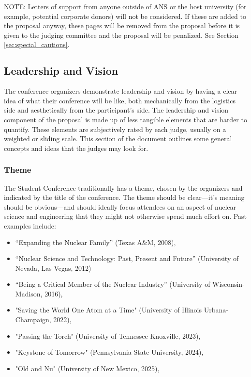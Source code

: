 \documentclass[12pt]{article}
\begin{document}
NOTE: Letters of support from anyone outside of ANS or the host university (for example,
potential corporate donors) will not be considered. If these are added to the
proposal anyway, these pages will be removed from the proposal before it is given to
the judging committee and the proposal will be penalized. See Section \ref{sec:special_cautions}.

\subsection{Leadership and Vision} \label{sec:LandV2}
The conference organizers demonstrate leadership and vision by having a clear idea of
what their conference will be like, both mechanically from the logistics side and
aesthetically from the participant’s side. The leadership and vision component of the
proposal is made up of less tangible elements that are harder to quantify. These elements
are subjectively rated by each judge, usually on a weighted or sliding scale. This section
of the document outlines some general concepts and ideas that the judges may look for.


\subsubsection{Theme}
The Student Conference traditionally has a theme, chosen by the organizers and indicated
by the title of the conference. The theme should be clear---it's meaning should be obvious---and should ideally focus attendees on an aspect of nuclear science and
engineering that they might not otherwise spend much effort on. Past examples include:
\begin{itemize}
    \item “Expanding the Nuclear Family” (Texas A\&M, 2008),
    \item “Nuclear Science and Technology: Past, Present and Future” (University of Nevada, Las Vegas, 2012)
    \item “Being a Critical Member of the Nuclear Industry” (University of Wisconsin-Madison, 2016),
    \item "Saving the World One Atom at a Time" (University of Illinois Urbana-Champaign, 2022),
    \item "Passing the Torch" (University of Tennessee Knoxville, 2023),
    \item "Keystone of Tomorrow" (Pennsylvania State University, 2024),
    \item "Old and Nu" (University of New Mexico, 2025),
\end{itemize}
\end{document}
